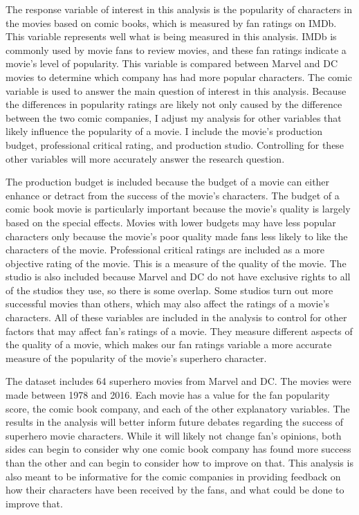 \documentclass{svproc}
\begin{document}
The response variable of interest in this analysis is the popularity of characters in the movies based on comic books, which is measured by fan ratings on IMDb. This variable represents well what is being measured in this analysis. IMDb is commonly used by movie fans to review movies, and these fan ratings indicate a movie's level of popularity. This variable is compared between Marvel and DC movies to determine which company has had more popular characters. The comic variable is used to answer the main question of interest in this analysis. Because the differences in popularity ratings are likely not only caused by the difference between the two comic companies, I adjust my analysis for other variables that likely influence the popularity of a movie. I include the movie's production budget, professional critical rating, and production studio. Controlling for these other variables will more accurately answer the research question.

The production budget is included because the budget of a movie can either enhance or detract from the success of the movie's characters. The budget of a comic book movie is particularly important because the movie's quality is largely based on the special effects. Movies with lower budgets may have less popular characters only because the movie's poor quality made fans less likely to like the characters of the movie. Professional critical ratings are included as a more objective rating of the movie. This is a measure of the quality of the movie. The studio is also included because Marvel and DC do not have exclusive rights to all of the studios they use, so there is some overlap. Some studios turn out more successful movies than others, which may also affect the ratings of a movie's characters. All of these variables are included in the analysis to control for other factors that may affect fan's ratings of a movie. They measure different aspects of the quality of a movie, which makes our fan ratings variable a more accurate measure of the popularity of the movie's superhero character. 

The dataset includes 64 superhero movies from Marvel and DC. The movies were made between 1978 and 2016. Each movie has a value for the fan popularity score, the comic book company, and each of the other explanatory variables. The results in the analysis will better inform future debates regarding the success of superhero movie characters. While it will likely not change fan's opinions, both sides can begin to consider why one comic book company has found more success than the other and can begin to consider how to improve on that. This analysis is also meant to be informative for the comic companies in providing feedback on how their characters have been received by the fans, and what could be done to improve that.
\end{document}
